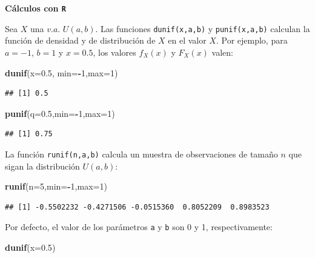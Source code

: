 \documentclass[]{book}
\newenvironment{Shaded}{\begin{snugshade}}{\end{snugshade}}
\newcommand{\DataTypeTok}[1]{\textcolor[rgb]{0.13,0.29,0.53}{#1}}
\newcommand{\DecValTok}[1]{\textcolor[rgb]{0.00,0.00,0.81}{#1}}
\newcommand{\FloatTok}[1]{\textcolor[rgb]{0.00,0.00,0.81}{#1}}
\newcommand{\KeywordTok}[1]{\textcolor[rgb]{0.13,0.29,0.53}{\textbf{#1}}}
\newcommand{\NormalTok}[1]{#1}
\newcommand{\OperatorTok}[1]{\textcolor[rgb]{0.81,0.36,0.00}{\textbf{#1}}}
\begin{document}
\textbf{Cálculos con \texttt{R}}

Sea \(X\) una \(v.a.\) \(U(a,b)\). Las funciones \texttt{dunif(x,a,b)} y \texttt{punif(x,a,b)} calculan la función de densidad y de distribución de \(X\) en el valor \(X\). Por ejemplo, para \(a=-1\), \(b=1\) y \(x=0.5\), los valores \(f_X(x)\) y \(F_X(x)\) valen:

\begin{Shaded}
\begin{Highlighting}[]
\KeywordTok{dunif}\NormalTok{(}\DataTypeTok{x=}\FloatTok{0.5}\NormalTok{, }\DataTypeTok{min=}\OperatorTok{-}\DecValTok{1}\NormalTok{,}\DataTypeTok{max=}\DecValTok{1}\NormalTok{)}
\end{Highlighting}
\end{Shaded}

\begin{verbatim}
## [1] 0.5
\end{verbatim}

\begin{Shaded}
\begin{Highlighting}[]
\KeywordTok{punif}\NormalTok{(}\DataTypeTok{q=}\FloatTok{0.5}\NormalTok{,}\DataTypeTok{min=}\OperatorTok{-}\DecValTok{1}\NormalTok{,}\DataTypeTok{max=}\DecValTok{1}\NormalTok{)}
\end{Highlighting}
\end{Shaded}

\begin{verbatim}
## [1] 0.75
\end{verbatim}

La función \texttt{runif(n,a,b)} calcula un muestra de observaciones de tamaño \(n\) que sigan la distribución \(U(a,b)\):

\begin{Shaded}
\begin{Highlighting}[]
\KeywordTok{runif}\NormalTok{(}\DataTypeTok{n=}\DecValTok{5}\NormalTok{,}\DataTypeTok{min=}\OperatorTok{-}\DecValTok{1}\NormalTok{,}\DataTypeTok{max=}\DecValTok{1}\NormalTok{)}
\end{Highlighting}
\end{Shaded}

\begin{verbatim}
## [1] -0.5502232 -0.4271506 -0.0515360  0.8052209  0.8983523
\end{verbatim}

Por defecto, el valor de los parámetros \texttt{a} y \texttt{b} son 0 y 1, respectivamente:

\begin{Shaded}
\begin{Highlighting}[]
\KeywordTok{dunif}\NormalTok{(}\DataTypeTok{x=}\FloatTok{0.5}\NormalTok{)}
\end{Highlighting}
\end{Shaded}
\end{document}
